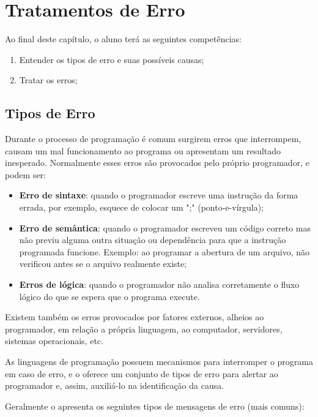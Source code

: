 \chapter{Tratamentos de Erro}
\label{tratamentos-de-erro}

Ao final deste capítulo, o aluno terá as seguintes competências:
\begin{enumerate}
    \item Entender os tipos de erro e suas possíveis causas;
    \item Tratar os erros;
\end{enumerate}

\section{Tipos de Erro}
\label{tipos-de-erro}

Durante o processo de programação é comum surgirem erros que interrompem, causam um mal funcionamento ao programa ou apresentam um resultado inesperado. Normalmente esses erros são provocados pelo próprio programador, e podem ser:

\begin{itemize}
  \item \textbf{Erro de sintaxe}: quando o programador escreve uma instrução da forma errada, por exemplo, esquece de colocar um ";" (ponto-e-vírgula);
  \item \textbf{Erro de semântica}: quando o programador escreveu um código correto mas não previu alguma outra situação ou dependência para que a instrução programada funcione. Exemplo: ao programar a abertura de um arquivo, não verificou antes se o arquivo realmente existe;
  \item \textbf{Erros de lógica}: quando o programador não analisa corretamente o fluxo lógico do que se espera que o programa execute.
\end{itemize}

Existem também os erros provocados por fatores externos, alheios ao programador, em relação a própria linguagem, ao computador, servidores, sistemas operacionais, etc. 

As linguagens de programação possuem mecanismos para interromper o programa em caso de erro, e o \php oferece um conjunto de tipos de erro para alertar ao programador e, assim, auxiliá-lo na identificação da causa.

Geralmente o \php apresenta os seguintes tipos de mensagens de erro (mais comuns):


